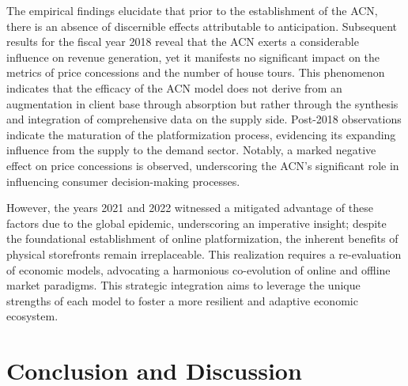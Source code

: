 \documentclass[12pt]{article}
\begin{document}
The empirical findings elucidate that prior to the establishment of the ACN, there is an absence of discernible effects attributable to anticipation. Subsequent results for the fiscal year 2018 reveal that the ACN exerts a considerable influence on revenue generation, yet it manifests no significant impact on the metrics of price concessions and the number of house tours. This phenomenon indicates that the efficacy of the ACN model does not derive from an augmentation in client base through absorption but rather through the synthesis and integration of comprehensive data on the supply side. Post-2018 observations indicate the maturation of the platformization process, evidencing its expanding influence from the supply to the demand sector. Notably, a marked negative effect on price concessions is observed, underscoring the ACN's significant role in influencing consumer decision-making processes.

However, the years 2021 and 2022 witnessed a mitigated advantage of these factors due to the global epidemic, underscoring an imperative insight; despite the foundational establishment of online platformization, the inherent benefits of physical storefronts remain irreplaceable. This realization requires a re-evaluation of economic models, advocating a harmonious co-evolution of online and offline market paradigms. This strategic integration aims to leverage the unique strengths of each model to foster a more resilient and adaptive economic ecosystem.

\section{Conclusion and Discussion} \label{sec:conclusion}
\end{document}
